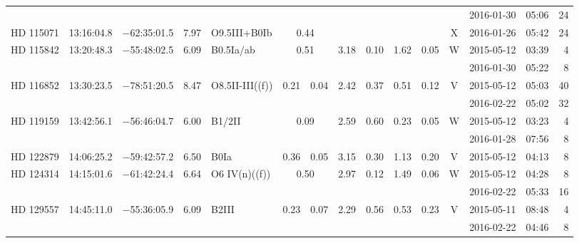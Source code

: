 \begin{tiny}
\begin{longtable}{lrrrll@{$\,\pm$\,}rl@{$\,\pm$\,}rl@{$\,\pm$\,}rcrrr}
              &          &               &            &                 & \multicolumn{6}{c}{}                              &       &2016-01-30 &05:06&   24\\  %
HD 115071     &13:16:04.8&  $-$62:35:01.5&        7.97&  O9.5III+B0Ib&\multicolumn{2}{c}{0.44}&\multicolumn{2}{c}{}&\multicolumn{2}{c}{}&X&2016-01-26&05:42&24\\  %
HD 115842     &13:20:48.3&  $-$55:48:02.5&        6.09&  B0.5Ia/ab&\multicolumn{2}{c}{0.51}& 3.18 & 0.10 &      1.62 & 0.05 &    W  &2015-05-12 &03:39&    4\\  %
              &          &               &            &                 & \multicolumn{6}{c}{}                              &       &2016-01-30 &05:22&    8\\  %
HD 116852     &13:30:23.5&  $-$78:51:20.5&        8.47&  O8.5II-III((f))& 0.21 & 0.04   &    2.42 & 0.37 &      0.51 & 0.12 &    V  &2015-05-12 &05:03&   40\\  %
              &          &               &            &                 & \multicolumn{6}{c}{}                              &       &2016-02-22 &05:02&   32\\  %
HD 119159     &13:42:56.1&  $-$56:46:04.7&        6.00&  B1/2II&\multicolumn{2}{c}{0.09}&    2.59 & 0.60 &      0.23 & 0.05 &    W  &2015-05-12 &03:23&    4\\  %
              &          &               &            &                 & \multicolumn{6}{c}{}                              &       &2016-01-28 &07:56&    8\\  %
HD 122879     &14:06:25.2&  $-$59:42:57.2&        6.50&  B0Ia           & 0.36 & 0.05   &    3.15 & 0.30 &      1.13 & 0.20 &    V  &2015-05-12 &04:13&    8\\  %
HD 124314     &14:15:01.6&  $-$61:42:24.4&        6.64&  O6 IV(n)((f))&\multicolumn{2}{c}{0.50}&2.97&0.12&      1.49 & 0.06 &    W  &2015-05-12 &04:28&    8\\  %
              &          &               &            &                 & \multicolumn{6}{c}{}                              &       &2016-02-22 &05:33&   16\\  %
HD 129557     &14:45:11.0&  $-$55:36:05.9&        6.09&  B2III          & 0.23 & 0.07   &    2.29 & 0.56 &      0.53 & 0.23 &    V  &2015-05-11 &08:48&    4\\  %
              &          &               &            &                 & \multicolumn{6}{c}{}                              &       &2016-02-22 &04:46&    8\\  %

\end{longtable}
\end{tiny}
